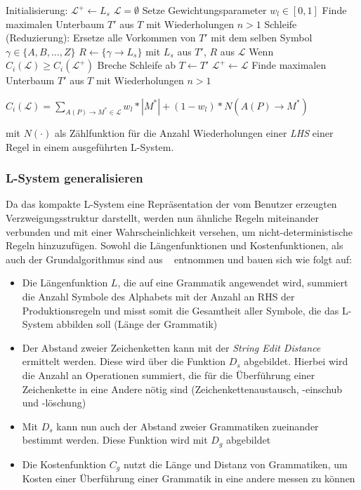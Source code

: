 \begin{algorithm}[caption={Erstellen eines kompakten L-Systems mit Gewichtung $w_l$}, label={alg3}]
    Initialisierung:
        $\mathcal{L}^+ \leftarrow L_s$
        $\mathcal{L}=\emptyset$
        Setze Gewichtungsparameter $w_l \in [0,1]$
        Finde maximalen Unterbaum $T'$ aus $T$ mit Wiederholungen $n>1$
    Schleife (Reduzierung):
        Ersetze alle Vorkommen von $T'$ mit dem selben Symbol $\gamma \in \{A,B,\dots,Z\}$
        $R \leftarrow \{\gamma \rightarrow L_s\}$ mit $L_s$ aus $T'$, $R$ aus $\mathcal{L}$
        Wenn $C_i(\mathcal{L}) \geq C_i(\mathcal{L}^+)$
            Breche Schleife ab
        $T \leftarrow T'$
        $\mathcal{L}^+ \leftarrow \mathcal{L}$
        Finde maximalen Unterbaum $T'$ aus $T$ mit Wiederholungen $n>1$
\end{algorithm}

\begin{algorithm}[caption={Kostenfunktion $C_i$ mit Gewichtung $w_l$}, label={alg4}]
    $C_i(\mathcal{L})= \sum\limits_{A(P) \rightarrow M^* \in \mathcal{L}} w_l * |M^*| + (1 - w_l) * N(A(P)\rightarrow M^*)$
\end{algorithm}
mit $N(\cdot)$ als Zählfunktion für die Anzahl Wiederholungen einer \textit{LHS} einer Regel in einem
ausgeführten L-System.

\subsubsection*{L-System generalisieren}
Da das kompakte L-System eine Repräsentation der vom Benutzer erzeugten Verzweigungsstruktur darstellt, werden
nun ähnliche Regeln miteinander verbunden und mit einer Wahrscheinlichkeit versehen, um nicht-deterministische
Regeln hinzuzufügen.
Sowohl die Längenfunktionen und Kostenfunktionen, als auch der Grundalgorithmus sind aus ~\cite{guo_2020} entnommen
und bauen sich wie folgt auf:

\begin{itemize}
    \item Die Längenfunktion $L$, die auf eine Grammatik angewendet wird, summiert die Anzahl Symbole des Alphabets mit
    der Anzahl an RHS der Produktionsregeln und misst somit die Gesamtheit aller Symbole, die das L-System abbilden soll
    (Länge der Grammatik)
    \item Der Abstand zweier Zeichenketten kann mit der \textit{String Edit Distance} ermittelt werden. Diese wird über
    die Funktion $D_s$ abgebildet. Hierbei wird die Anzahl an Operationen summiert, die für die Überführung einer Zeichenkette
    in eine Andere nötig sind (Zeichenkettenaustausch, -einschub und -löschung)
    \item Mit $D_s$ kann nun auch der Abstand zweier Grammatiken zueinander bestimmt werden. Diese Funktion wird mit
    $D_g$ abgebildet
    \item Die Kostenfunktion $C_g$ nutzt die Länge und Distanz von Grammatiken, um Kosten einer Überführung einer Grammatik
    in eine andere messen zu können
\end{itemize}

